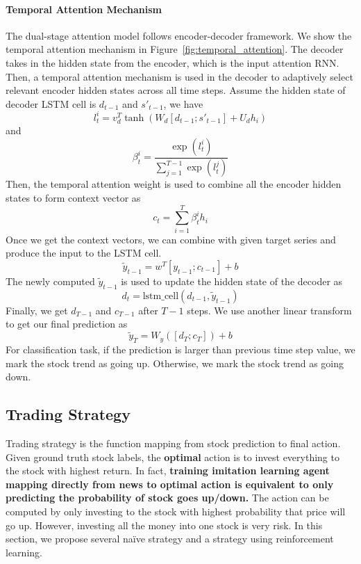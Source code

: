 \documentclass[11pt,a4paper]{article}
\begin{document}
\paragraph{Temporal Attention Mechanism}
The dual-stage attention model follows encoder-decoder framework. We show the temporal attention mechanism in Figure~\ref{fig:temporal_attention}. The decoder takes in the hidden state from the encoder, which is the input attention RNN. Then, a temporal attention mechanism is used in the decoder to adaptively select relevant encoder hidden states across all time steps. Assume the hidden state of decoder LSTM cell is $d_{t-1}$ and $s'_{t-1}$, we have
\begin{equation}
l^{i}_{t}=v^T_d \tanh(W_d[d_{t-1};s'_{t-1}]+U_dh_i)
\end{equation}
and 
\begin{equation}
\beta^i_{t}=\frac{\exp(l^{i}_{t})}{\sum_{j=1}^{T-1}\exp(l^{j}_{t})}
\end{equation}
Then, the temporal attention weight is used to combine all the encoder hidden states to form context vector as
\begin{equation}
c_t=\sum_{i=1}^{T} \beta^i_{t}h_i
\end{equation}
Once we get the context vectors, we can combine with given target series and produce the input to the LSTM cell.
\begin{equation}
\tilde{y}_{t-1} = w^T[y_{t-1};c_{t-1}] + b
\end{equation}
The newly computed $\tilde{y}_{t-1}$ is used to update the hidden state of the decoder as
\begin{equation}
d_t=\text{lstm\_cell}(d_{t-1}, \tilde{y}_{t-1})
\end{equation}
Finally, we get $d_{T-1}$ and $c_{T-1}$ after $T-1$ steps. We use another linear transform to get our final prediction as
\begin{equation}
\tilde{y}_{T}=W_y([d_T;c_T])+b
\end{equation}
For classification task, if the prediction is larger than previous time step value, we mark the stock trend as going up. Otherwise, we mark the stock trend as going down.

\subsection{Trading Strategy}
Trading strategy is the function mapping from stock prediction to final action. Given ground truth stock labels, the \textbf{optimal} action is to invest everything to the stock with highest return. In fact, \textbf{training imitation learning agent mapping directly from news to optimal action is equivalent to only predicting the probability of stock goes up/down.} The action can be computed by only investing to the stock with highest probability that price will go up. However, investing all the money into one stock is very risk. In this section, we propose several na\"ive strategy and a strategy using reinforcement learning.
\end{document}
